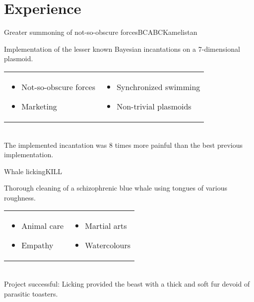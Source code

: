 ﻿\documentclass{fullercv}
\begin{document}
\section{Experience}
    {Greater summoning of not-so-obscure forces}{BCABC}{Kamelistan}{}
    {Implementation of the lesser known Bayesian incantations on a 7-dimensional
    plasmoid. \\
    \begin{tabular}{p{}p{}}
    \begin{itemize}
        \item Not-so-obscure forces
        \item Marketing
    \end{itemize} &
    \begin{itemize}
        \item Synchronized swimming
        \item Non-trivial plasmoids
    \end{itemize}
    \end{tabular} \\[-1em]
    The implemented incantation was 8 times more painful than the best previous
    implementation.
}
    {Whale licking}{KILL}{}{}
    {Thorough cleaning of a schizophrenic blue whale using tongues of various
    roughness. \\
    \begin{tabular}{p{}p{}}
    \begin{itemize}
        \item Animal care
        \item Empathy
    \end{itemize} &
    \begin{itemize}
        \item Martial arts
        \item Watercolours
    \end{itemize}
    \end{tabular} \\[-1em]
    Project successful: Licking provided the beast with a thick and soft fur
    devoid of parasitic toasters.
}
\end{document}
